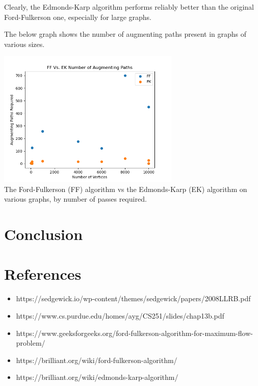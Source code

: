 \documentclass[12pt]{amsart}
\begin{document}
    Clearly, the Edmonds-Karp algorithm performs reliably
    better than the original Ford-Fulkerson one, especially for
    large graphs.

    The below graph shows the number of augmenting paths present
    in graphs of various sizes.

\begin{center}
    \includegraphics[width=0.65\textwidth]{mf_passes_comparison.png} \\
    The Ford-Fulkerson (FF) algorithm vs the Edmonds-Karp (EK)
    algorithm on various graphs, by number of passes required. \\
    \vskip 1cm
\end{center}

\section{Conclusion}

\section{References}

\begin{itemize}
    \item https://sedgewick.io/wp-content/themes/sedgewick/papers/2008LLRB.pdf
    \item https://www.cs.purdue.edu/homes/ayg/CS251/slides/chap13b.pdf
    \item https://www.geeksforgeeks.org/ford-fulkerson-algorithm-for-maximum-flow-problem/
    \item https://brilliant.org/wiki/ford-fulkerson-algorithm/    
    \item https://brilliant.org/wiki/edmonds-karp-algorithm/
\end{itemize}
\end{document}
